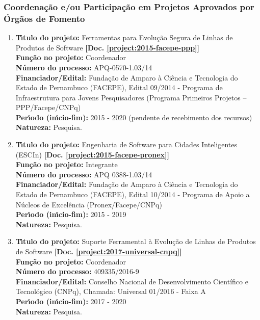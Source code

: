 \documentclass[a4paper,oneside,10pt]{article}
\begin{document}
\subsubsection{Coordena\c{c}\~{a}o e/ou Participa\c{c}\~{a}o em Projetos Aprovados por \'{O}rg\~{a}os de Fomento}
\vspace{0.3cm}

\begin{enumerate}
\renewcommand{\labelenumi}{{\large\bfseries\arabic{enumi}.}}

\item \textbf{T\'{\i}tulo do projeto:} Ferramentas para Evolução Segura de Linhas de Produtos de Software \textbf{[Doc. \ref{project:2015-facepe-ppp}]}\\
      \textbf{Fun\c{c}\~{a}o no projeto:} Coordenador\\
      \textbf{N\'{u}mero do processo:} APQ-0570-1.03/14\\
      \textbf{Financiador/Edital:} Fundação de Amparo à Ciência e Tecnologia do Estado de Pernambuco (FACEPE), Edital 09/2014 - Programa de Infraestrutura para Jovens Pesquisadores (Programa Primeiros Projetos – PPP/Facepe/CNPq)\\
      \textbf{Per\'{\i}odo (in\'{\i}cio-fim):} 2015 - 2020 (pendente de recebimento dos recursos)\\
      \textbf{Natureza:} Pesquisa.

\item \textbf{T\'{\i}tulo do projeto:} Engenharia de Software para Cidades Inteligentes (ESCIn) \textbf{[Doc. \ref{project:2015-facepe-pronex}]}\\
      \textbf{Fun\c{c}\~{a}o no projeto:} Integrante\\
      \textbf{N\'{u}mero do processo:} APQ 0388-1.03/14\\
      \textbf{Financiador/Edital:} Fundação de Amparo à Ciência e Tecnologia do Estado de Pernambuco (FACEPE), Edital 10/2014 - Programa de Apoio a Núcleos de Excelência (Pronex/Facepe/CNPq)\\
      \textbf{Per\'{\i}odo (in\'{\i}cio-fim):} 2015 - 2019\\
      \textbf{Natureza:} Pesquisa.

\item \textbf{T\'{\i}tulo do projeto:} Suporte Ferramental à Evolução de Linhas de Produtos de Software \textbf{[Doc. \ref{project:2017-universal-cnpq}]}\\
      \textbf{Fun\c{c}\~{a}o no projeto:} Coordenador\\
      \textbf{N\'{u}mero do processo:} 409335/2016-9\\
      \textbf{Financiador/Edital:} Conselho Nacional de Desenvolvimento Científico e Tecnológico (CNPq), Chamada: Universal 01/2016 - Faixa A\\
      \textbf{Per\'{\i}odo (in\'{\i}cio-fim):} 2017 - 2020\\
      \textbf{Natureza:} Pesquisa.


\end{enumerate}
\end{document}
